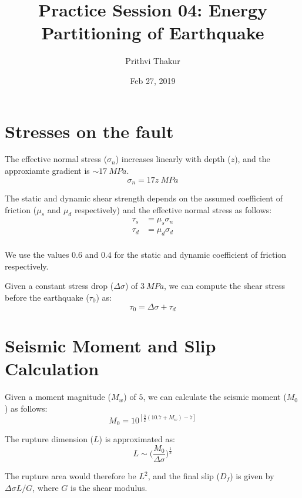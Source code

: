 \documentclass[11pt]{article}
\title{Practice Session 04: Energy Partitioning of Earthquake}
\author{Prithvi Thakur}
\date{Feb 27, 2019}
\begin{document}
\maketitle

\section*{Stresses on the fault}
The effective normal stress ($\sigma_n$) increases linearly with depth ($z$), and the approxiamte gradient is $\sim 17\ MPa$.
\begin{equation}
\sigma_n = 17z\ MPa
\end{equation}

The static and dynamic shear strength depends on the assumed coefficient of friction ($\mu_s$ and $\mu_d$ respectively) and the effective normal stress as follows:
\begin{equation}
    \begin{aligned}
        \tau_s &= \mu_s \sigma_n \\
        \tau_d &= \mu_d \sigma_d \\
    \end{aligned}
\end{equation}

We use the values $0.6$ and $0.4$ for the static and dynamic coefficient of friction respectively.

Given a constant stress drop ($\Delta\sigma$) of $3\ MPa$, we can compute the shear stress before the earthquake ($\tau_0$) as:
\begin{equation}
    \tau_0 = \Delta\sigma + \tau_d
\end{equation}

\section*{Seismic Moment and Slip Calculation}
Given a moment magnitude ($M_w$) of $5$, we can calculate the seismic moment ($M_0$) as follows:
\begin{equation}
    M_0 = 10^{[\frac{3}{2}(10.7 + M_w) - 7]}
\end{equation}

The rupture dimension ($L$) is approximated as:
\begin{equation}
    L \sim \big(\frac{M_0}{\Delta\sigma}\big)^{\frac{1}{3}}
\end{equation}

The rupture area would therefore be $L^2$, and the final slip ($D_f$) is given by $\Delta\sigma L/G$, where $G$ is the shear modulus.
\end{document}
